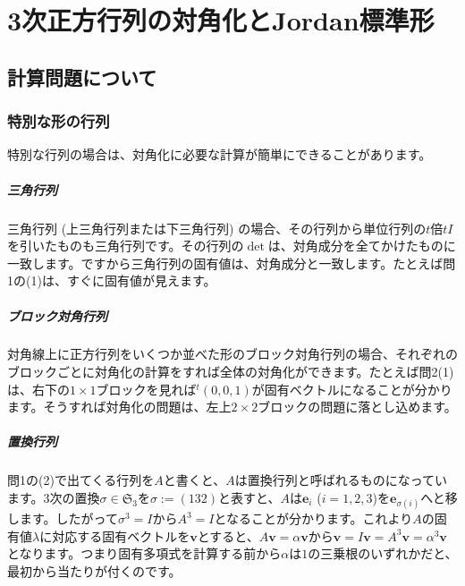 \chapter{3次正方行列の対角化とJordan標準形}


\section{計算問題について}

\subsection{特別な形の行列}

特別な行列の場合は、対角化に必要な計算が簡単にできることがあります。

\paragraph{三角行列}

三角行列 (上三角行列または下三角行列) の場合、その行列から単位行列の$t$倍$t I$を引いたものも三角行列です。その行列の$\det$は、対角成分を全てかけたものに一致します。ですから三角行列の固有値は、対角成分と一致します。たとえば問1の(1)は、すぐに固有値が見えます。

\paragraph{ブロック対角行列}

対角線上に正方行列をいくつか並べた形のブロック対角行列の場合、それぞれのブロックごとに対角化の計算をすれば全体の対角化ができます。たとえば問2(1)は、右下の$1 \times 1$ブロックを見れば${}^t(0, 0, 1)$が固有ベクトルになることが分かります。そうすれば対角化の問題は、左上$2 \times 2$ブロックの問題に落とし込めます。

\paragraph{置換行列}

問1の(2)で出てくる行列を$A$と書くと、$A$は置換行列と呼ばれるものになっています。$3$次の置換$\sigma \in \mathfrak{S}_3$を$\sigma := (132)$と表すと、$A$は$\bm{e}_i$ ($i = 1, 2, 3$)を$\bm{e}_{\sigma(i)}$へと移します。したがって$\sigma^3 = I$から$A^3 = I$となることが分かります。これより$A$の固有値$\lambda$に対応する固有ベクトルを$\bm{v}$とすると、$A\bm{v} = \alpha\bm{v}$から$\bm{v} = I\bm{v} = A^3 \bm{v} = \alpha^3 \bm{v}$となります。つまり固有多項式を計算する前から$\alpha$は$1$の三乗根のいずれかだと、最初から当たりが付くのです。

